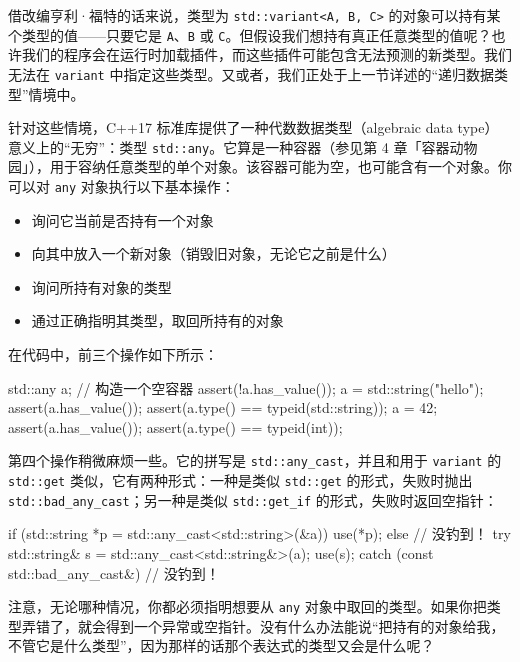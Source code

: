 借改编亨利·福特的话来说，类型为 \texttt{std::\allowbreak{}variant<\allowbreak{}A,\allowbreak{} B,\allowbreak{} C>\allowbreak{}} 的对象可以持有某个类型的值——只要它是 \texttt{A}、\texttt{B} 或 \texttt{C}。但假设我们想持有真正任意类型的值呢？也许我们的程序会在运行时加载插件，而这些插件可能包含无法预测的新类型。我们无法在 \texttt{variant} 中指定这些类型。又或者，我们正处于上一节详述的“递归数据类型”情境中。

针对这些情境，C++17 标准库提供了一种代数数据类型（algebraic data type）意义上的“无穷”：类型 \texttt{std::\allowbreak{}any}。它算是一种容器（参见第 4 章「容器动物园」），用于容纳任意类型的单个对象。该容器可能为空，也可能含有一个对象。你可以对 \texttt{any} 对象执行以下基本操作：

\begin{itemize}
\item 询问它当前是否持有一个对象
\item 向其中放入一个新对象（销毁旧对象，无论它之前是什么）
\item 询问所持有对象的类型
\item 通过正确指明其类型，取回所持有的对象
\end{itemize}

在代码中，前三个操作如下所示：

\begin{codebox}[cpp]
    std::any a; // 构造一个空容器
    assert(!a.has_value());
    a = std::string("hello");
    assert(a.has_value());
    assert(a.type() == typeid(std::string));
    a = 42;
    assert(a.has_value());
    assert(a.type() == typeid(int));
\end{codebox}

第四个操作稍微麻烦一些。它的拼写是 \texttt{std::\allowbreak{}any\_\allowbreak{}cast}，并且和用于 \texttt{variant} 的 \texttt{std::\allowbreak{}get} 类似，它有两种形式：一种是类似 \texttt{std::\allowbreak{}get} 的形式，失败时抛出 \texttt{std::\allowbreak{}bad\_\allowbreak{}any\_\allowbreak{}cast}；另一种是类似 \texttt{std::\allowbreak{}get\_\allowbreak{}if} 的形式，失败时返回空指针：

\begin{codebox}[cpp]
    if (std::string *p = std::any_cast<std::string>(&a)) {
      use(*p);
    } else {
      // 没钓到！
    }
    try {
      std::string& s = std::any_cast<std::string&>(a);
      use(s);
    } catch (const std::bad_any_cast&) {
      // 没钓到！
    }
\end{codebox}

注意，无论哪种情况，你都必须指明想要从 \texttt{any} 对象中取回的类型。如果你把类型弄错了，就会得到一个异常或空指针。没有什么办法能说“把持有的对象给我，不管它是什么类型”，因为那样的话那个表达式的类型又会是什么呢？

